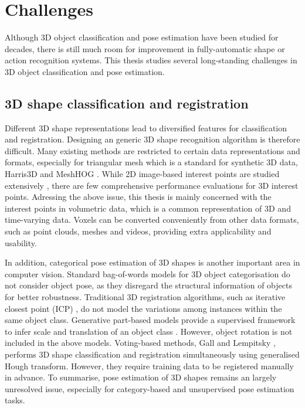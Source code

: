 \section{Challenges}

Although 3D object classification and pose estimation have been studied for decades, there is still much room for improvement in fully-automatic shape or action recognition systems. 
This thesis studies several long-standing challenges in 3D object classification and pose estimation.  

\subsection{3D shape classification and registration} 

Different 3D shape representations lead to diversified features for classification and registration. Designing an generic 3D shape recognition algorithm is therefore difficult. Many existing methods are restricted to certain data representations and formats, especially for triangular mesh which is a standard for synthetic 3D data, \eg Harris3D \cite{Sipiran2011} and MeshHOG \cite{Zaharescu2009}.     
While 2D image-based interest points are studied extensively \cite{Mikolajczyk2005}, there are few comprehensive performance evaluations for 3D interest points. 
Adressing the above issue, this thesis is mainly concerned with the interest points in volumetric data, which is a common representation of 3D and time-varying data. Voxels can be converted conveniently from other data formats, such as point clouds, meshes and videos, providing extra applicability and usability. 

In addition, categorical pose estimation of 3D shapes is another important area in computer vision.
Standard bag-of-words models for 3D object categorisation do not consider object pose, as they disregard the structural information of objects for better robustness. Traditional 3D registration algorithms, such as iterative closest point (ICP) \cite{Besl1992}, do not model the variations among instances within the same object class. 
Generative part-based models provide a supervised framework to infer scale and translation of an object class \cite{Weber2000, Fergus2007}. However, object rotation is not included in the above models. 
Voting-based methods, \eg Gall and Lempitsky \cite{Gall2009a}, performs 3D shape classification and registration simultaneously using generalised Hough transform. However, they require training data to be registered manually in advance.  
To summarise, pose estimation of 3D shapes remains an largely unresolved issue, especially for category-based and unsupervised pose estimation tasks.  

